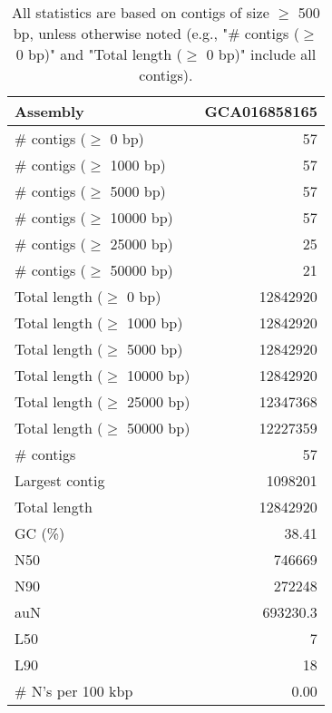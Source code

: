 \documentclass[12pt,a4paper]{article}
\begin{document}
\begin{table}[ht]
\begin{center}
\caption{All statistics are based on contigs of size $\geq$ 500 bp, unless otherwise noted (e.g., "\# contigs ($\geq$ 0 bp)" and "Total length ($\geq$ 0 bp)" include all contigs).}
\begin{tabular}{|l*{1}{|r}|}
\hline
Assembly & GCA016858165 \\ \hline
\# contigs ($\geq$ 0 bp) & 57 \\ \hline
\# contigs ($\geq$ 1000 bp) & 57 \\ \hline
\# contigs ($\geq$ 5000 bp) & 57 \\ \hline
\# contigs ($\geq$ 10000 bp) & 57 \\ \hline
\# contigs ($\geq$ 25000 bp) & 25 \\ \hline
\# contigs ($\geq$ 50000 bp) & 21 \\ \hline
Total length ($\geq$ 0 bp) & 12842920 \\ \hline
Total length ($\geq$ 1000 bp) & 12842920 \\ \hline
Total length ($\geq$ 5000 bp) & 12842920 \\ \hline
Total length ($\geq$ 10000 bp) & 12842920 \\ \hline
Total length ($\geq$ 25000 bp) & 12347368 \\ \hline
Total length ($\geq$ 50000 bp) & 12227359 \\ \hline
\# contigs & 57 \\ \hline
Largest contig & 1098201 \\ \hline
Total length & 12842920 \\ \hline
GC (\%) & 38.41 \\ \hline
N50 & 746669 \\ \hline
N90 & 272248 \\ \hline
auN & 693230.3 \\ \hline
L50 & 7 \\ \hline
L90 & 18 \\ \hline
\# N's per 100 kbp & 0.00 \\ \hline
\end{tabular}
\end{center}
\end{table}
\end{document}
